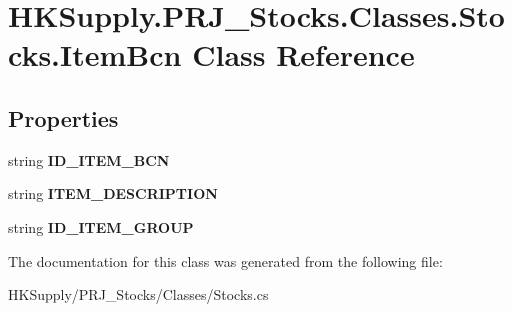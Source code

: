 \hypertarget{class_h_k_supply_1_1_p_r_j___stocks_1_1_classes_1_1_stocks_1_1_item_bcn}{}\section{H\+K\+Supply.\+P\+R\+J\+\_\+\+Stocks.\+Classes.\+Stocks.\+Item\+Bcn Class Reference}
\label{class_h_k_supply_1_1_p_r_j___stocks_1_1_classes_1_1_stocks_1_1_item_bcn}
\subsection*{Properties}
\begin{DoxyCompactItemize}
\item 
\mbox{\label{class_h_k_supply_1_1_p_r_j___stocks_1_1_classes_1_1_stocks_1_1_item_bcn_a112ca9f14c195f41bfd51daf5969aa45}} 
string {\bfseries I\+D\+\_\+\+I\+T\+E\+M\+\_\+\+B\+CN}
\item 
\mbox{\label{class_h_k_supply_1_1_p_r_j___stocks_1_1_classes_1_1_stocks_1_1_item_bcn_a21e5cc1e442cc6747133940a259d5c7e}} 
string {\bfseries I\+T\+E\+M\+\_\+\+D\+E\+S\+C\+R\+I\+P\+T\+I\+ON}
\item 
\mbox{\label{class_h_k_supply_1_1_p_r_j___stocks_1_1_classes_1_1_stocks_1_1_item_bcn_a41e1ce86c8b4ab443a1ebe9ee1299b44}} 
string {\bfseries I\+D\+\_\+\+I\+T\+E\+M\+\_\+\+G\+R\+O\+UP}
\end{DoxyCompactItemize}


The documentation for this class was generated from the following file\+:\begin{DoxyCompactItemize}
\item 
H\+K\+Supply/\+P\+R\+J\+\_\+\+Stocks/\+Classes/Stocks.\+cs\end{DoxyCompactItemize}
